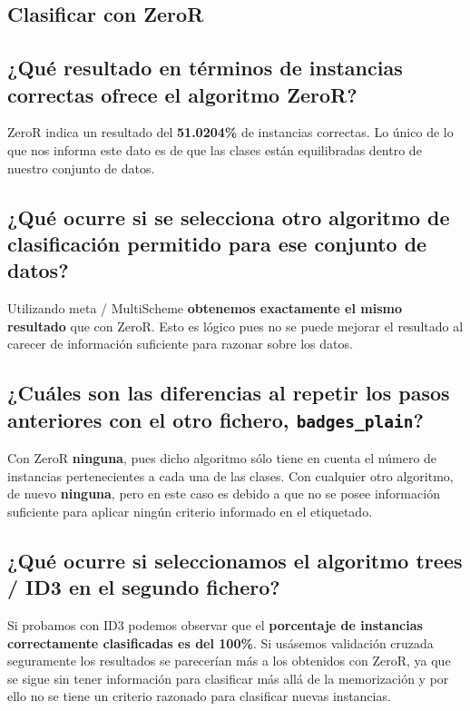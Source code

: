 \documentclass[12pt]{article}
\begin{document}
\newpage

\begin{center}
\section{Clasificar con ZeroR}
\end{center}

\subsection*{\small ¿Qué resultado en términos de instancias correctas ofrece el
algoritmo ZeroR?}

ZeroR indica un resultado del \textbf{51.0204\%} de instancias correctas. Lo único de lo que nos informa este dato es de que las clases están equilibradas dentro de nuestro conjunto de datos.

\subsection*{\small ¿Qué ocurre si se selecciona otro algoritmo de clasificación permitido para ese conjunto de datos?}

Utilizando meta / MultiScheme \textbf{obtenemos exactamente el mismo resultado} que con ZeroR. Esto es lógico pues no se puede mejorar el resultado al carecer de información suficiente para razonar sobre los datos.

\subsection*{\small ¿Cuáles son las diferencias al repetir los pasos anteriores con el otro fichero, \texttt{badges\_plain}?}

Con ZeroR \textbf{ninguna}, pues dicho algoritmo sólo tiene en cuenta el número de instancias pertenecientes a cada una de las clases. Con cualquier otro algoritmo, de nuevo \textbf{ninguna}, pero en este caso es debido a que no se posee información suficiente para aplicar ningún criterio informado en el etiquetado.

\subsection*{\small ¿Qué ocurre si seleccionamos el algoritmo trees / ID3 en el segundo fichero?}

Si probamos con ID3 podemos observar que el \textbf{porcentaje de instancias correctamente clasificadas es del 100\%}. Si usásemos validación cruzada seguramente los resultados se parecerían más a los obtenidos con ZeroR, ya que se sigue sin tener información para clasificar más allá de la memorización y por ello no se tiene un criterio razonado para clasificar nuevas instancias.
\end{document}
